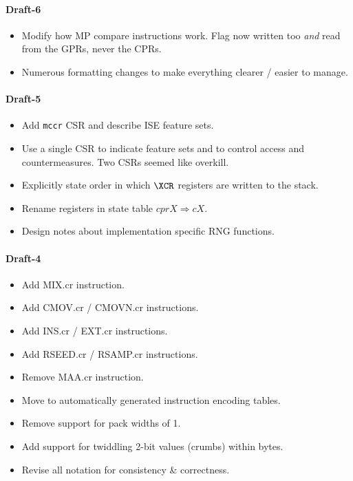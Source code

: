 
\paragraph{Draft-6}
\begin{itemize}
\item Modify how MP compare instructions work. Flag now written too {\em and}   
    read from the GPRs, never the CPRs.
\item Numerous formatting changes to make everything clearer / easier to
    manage.
\end{itemize}

\paragraph{Draft-5}
\begin{itemize}
\item Add {\tt mccr} CSR and describe ISE feature sets.
\item Use a single CSR to indicate feature sets and to control
    access and countermeasures. Two CSRs seemed like overkill.
\item Explicitly state order in which $\XCR$ registers are written to 
    the stack.
\item Rename registers in state table $cprX \Rightarrow cX$.
\item Design notes about implementation specific RNG functions.
\end{itemize}


\paragraph{Draft-4}
\begin{itemize}
\item Add MIX.cr instruction.
\item Add CMOV.cr / CMOVN.cr instructions.
\item Add INS.cr / EXT.cr instructions.
\item Add RSEED.cr / RSAMP.cr instructions.
\item Remove MAA.cr instruction.
\item Move to automatically generated instruction encoding tables.
\item Remove support for pack widths of 1.
\item Add support for twiddling 2-bit values (crumbs) within bytes.
\item Revise all notation for consistency \& correctness.
\end{itemize}

